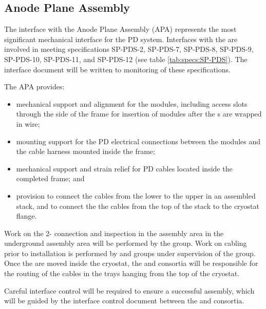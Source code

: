 \subsection{Anode Plane Assembly}

The interface with the Anode Plane Assembly (APA) represents the most significant mechanical interface for the PD system. Interfaces with the  are involved in meeting specifications SP-PDS-2, SP-PDS-7, SP-PDS-8, SP-PDS-9, SP-PDS-10, SP-PDS-11, and SP-PDS-12 (see table \ref{tab:specs:SP-PDS}).  The interface document will be written to monitoring of these specifications.


The APA provides:

\begin{itemize}

\item mechanical support and alignment for the  modules, including access slots through the side of the frame for insertion of modules after the s are wrapped in wire;

\item mounting support for the PD electrical connections between the  modules and the cable harness mounted inside the  frame;

\item mechanical support and strain relief for PD cables located inside the completed  frame; and

\item provision to connect the  cables from the lower  to the upper  in an assembled  stack, and to connect the the 
cables from the top of the  stack to the cryostat flange.

\end{itemize}

Work on the 2- connection and inspection in the assembly area in the underground assembly area will be performed by the  group. Work on cabling prior to installation is performed by  and  groups under supervision of the  group. Once the  are moved inside the cryostat, the  and  consortia will be responsible for the routing of the cables in the trays hanging from the top of the cryostat. 

Careful interface control will be required to ensure a successful assembly, which will be guided by the interface control document between the  and  consortia.  




